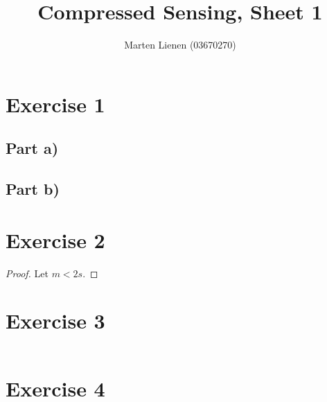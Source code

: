 \documentclass[10pt,a4paper]{article}
\title{Compressed Sensing, Sheet 1}
\author{Marten Lienen (03670270)}
\begin{document}
\maketitle

\section*{Exercise 1}

\subsection*{Part a)}

\subsection*{Part b)}

\section*{Exercise 2}

\begin{proof}
  Let $m < 2s$.
\end{proof}

\section*{Exercise 3}

\inputminted{matlab}{sheet-1/prony.m}

\section*{Exercise 4}
\end{document}
